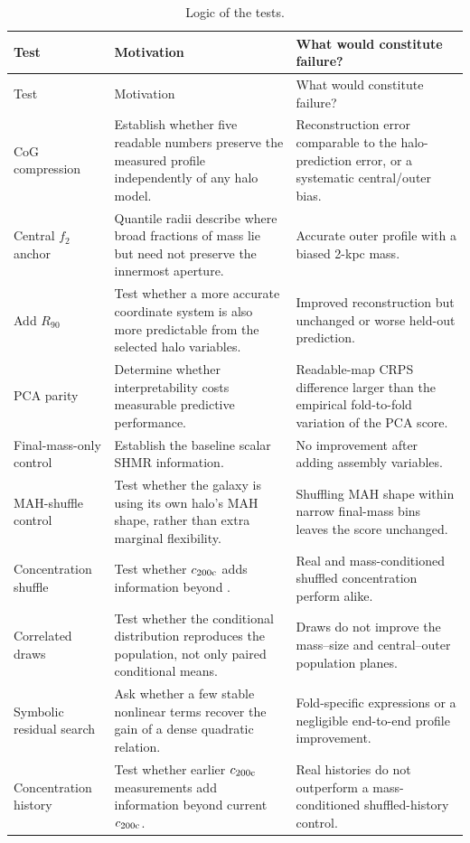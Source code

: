 \begin{longtable}{@{}p{}p{}p{}@{}}
  \caption{Logic of the \ExpFifty{} tests.}\label{tab:exp50_tests}\\
  \toprule
  Test & Motivation & What would constitute failure? \\
  \midrule
  \endfirsthead
  \toprule
  Test & Motivation & What would constitute failure? \\
  \midrule
  \endhead
  CoG compression & Establish whether five readable numbers preserve the
  measured profile independently of any halo model. & Reconstruction error
  comparable to the halo-prediction error, or a systematic central/outer bias.\\
  Central $f_2$ anchor & Quantile radii describe where broad fractions of mass
  lie but need not preserve the innermost aperture. & Accurate outer profile
  with a biased 2-kpc mass.\\
  Add $R_{90}$ & Test whether a more accurate coordinate system is also more
  predictable from the selected halo variables. & Improved reconstruction but
  unchanged or worse held-out prediction.\\
  PCA parity & Determine whether interpretability costs measurable predictive
  performance. & Readable-map CRPS difference larger than the empirical
  fold-to-fold variation of the PCA score.\\
  Final-mass-only control & Establish the baseline scalar SHMR information. &
  No improvement after adding assembly variables.\\
  MAH-shuffle control & Test whether the galaxy is using its own halo's MAH
  shape, rather than extra marginal flexibility. & Shuffling MAH shape within
  narrow final-mass bins leaves the score unchanged.\\
  Concentration shuffle & Test whether $c_{200\mathrm{c}}$ adds information beyond
  \diffmah{}. & Real and mass-conditioned shuffled concentration perform alike.\\
  Correlated draws & Test whether the conditional distribution reproduces the
  population, not only paired conditional means. & Draws do not improve the
  mass--size and central--outer population planes.\\
  Symbolic residual search & Ask whether a few stable nonlinear terms recover
  the gain of a dense quadratic relation. & Fold-specific expressions or a
  negligible end-to-end profile improvement.\\
  Concentration history & Test whether earlier $c_{200\mathrm{c}}$ measurements add
  information beyond current $c_{200\mathrm{c}}$. & Real histories do not outperform a
  mass-conditioned shuffled-history control.\\
  \bottomrule
\end{longtable}

